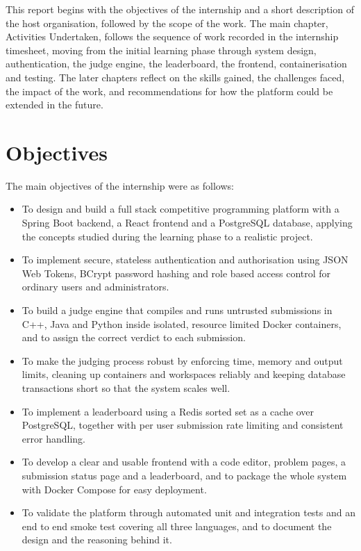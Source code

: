 \documentclass[12pt,a4paper]{report}
\begin{document}
This report begins with the objectives of the internship and a short description of the host organisation, followed by the scope of the work. The main chapter, Activities Undertaken, follows the sequence of work recorded in the internship timesheet, moving from the initial learning phase through system design, authentication, the judge engine, the leaderboard, the frontend, containerisation and testing. The later chapters reflect on the skills gained, the challenges faced, the impact of the work, and recommendations for how the platform could be extended in the future.

\chapter*{Objectives}

The main objectives of the internship were as follows:

\begin{itemize}
    \item To design and build a full stack competitive programming platform with a Spring Boot backend, a React frontend and a PostgreSQL database, applying the concepts studied during the learning phase to a realistic project.

    \item To implement secure, stateless authentication and authorisation using JSON Web Tokens, BCrypt password hashing and role based access control for ordinary users and administrators.

    \item To build a judge engine that compiles and runs untrusted submissions in C++, Java and Python inside isolated, resource limited Docker containers, and to assign the correct verdict to each submission.

    \item To make the judging process robust by enforcing time, memory and output limits, cleaning up containers and workspaces reliably and keeping database transactions short so that the system scales well.

    \item To implement a leaderboard using a Redis sorted set as a cache over PostgreSQL, together with per user submission rate limiting and consistent error handling.

    \item To develop a clear and usable frontend with a code editor, problem pages, a submission status page and a leaderboard, and to package the whole system with Docker Compose for easy deployment.

    \item To validate the platform through automated unit and integration tests and an end to end smoke test covering all three languages, and to document the design and the reasoning behind it.
\end{itemize}
\end{document}
